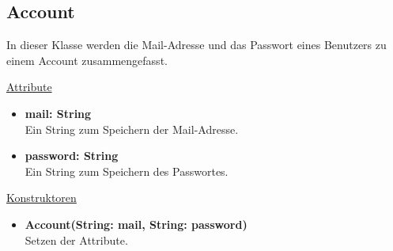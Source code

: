 \newpage
\subsection{Account}\label{Account}
In dieser Klasse werden die Mail-Adresse und das Passwort eines Benutzers zu einem Account zusammengefasst. \newline

\underline{Attribute}
\begin{itemize}
\itemsep0pt
\item \textbf{mail: String} \hfill\\ 
Ein String zum Speichern der Mail-Adresse.

\item \textbf{password: String} \hfill\\ 
Ein String zum Speichern des Passwortes.

\end{itemize}

\underline{Konstruktoren}
\begin{itemize}
\itemsep0pt
\item \textbf{Account(String: mail, String: password)} \hfill\\
Setzen der Attribute.
\end{itemize}
